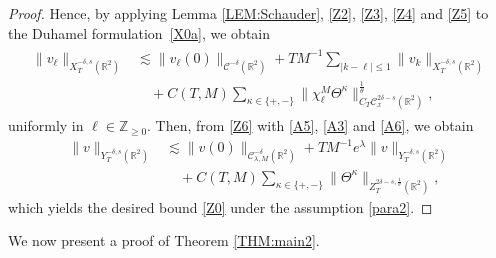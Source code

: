 \documentclass[letterpaper, 11pt,  reqno]{amsart}
\theoremstyle{myremark}
\newcommand{\Ta}{\Theta}
\newcommand{\1}{\hspace{0.5mm}\text{I}\hspace{0.5mm}}
\newcommand{\Z}{\mathbb{Z}}
\newcommand{\R}{\mathbb{R}}
\newcommand{\CC}{\mathcal{C}}
\newcommand{\dl}{\delta}
\newcommand{\kk}{\kappa}
\newcommand{\ld}{\lambda}
\newcommand{\ta}{\theta}
\renewcommand{\l}{\ell}
\newcommand{\les}{\lesssim}
\numberwithin{equation}{section}
\numberwithin{theorem}{section}
\begin{document}
\begin{proof}
Hence, by applying
Lemma \ref{LEM:Schauder}, 
  \eqref{Z2},  \eqref{Z3}, \eqref{Z4} and \eqref{Z5} 
  to the Duhamel formulation~\eqref{X0a}, we obtain
\begin{align}
\begin{split}
\|v_\l\|_{X^{-\dl,s}_T(\R^2)} & \les \|v_\l(0)\|_{\CC^{-\dl}(\R^2)} + T  M^{-1} 
\sum_{ |k - \l| \le 1} \|v_k\|_{X^{-\dl,s}_T(\R^2)} \\
& \quad  + C(T,M)  \sum_{\kk \in \{+, -\}} \|\chi^M_\l \Ta^\kk \|_{C_T \CC_x^{2\dl-s}(\R^2)}^\frac1 \ta,
\end{split}
\label{Z6}
\end{align}
uniformly in $\l \in \Z_{\ge 0}$.
Then, from \eqref{Z6} with \eqref{A5}, \eqref{A3} and \eqref{A6}, we obtain
\begin{align*}
\|v\|_{Y^{-\dl,s}_T(\R^2)} 
& \les 
\|v(0)\|_{\CC^{-\dl}_{\ld, M}(\R^2)} + T  M^{-1} e^{\ld}\|v\|_{Y^{-\dl,s}_T(\R^2)} \\
& \quad  + C(T,M)  
\sum_{\kk \in \{+, -\}}
\|\Ta^\kk\|_{Z^{2\dl-s, \frac{1}{\ta}}_T(\R^2)},
\end{align*}
which 
yields the desired bound
 \eqref{Z0} under the assumption \eqref{para2}.
\end{proof}





We now present a proof of Theorem \ref{THM:main2}.
\end{document}

